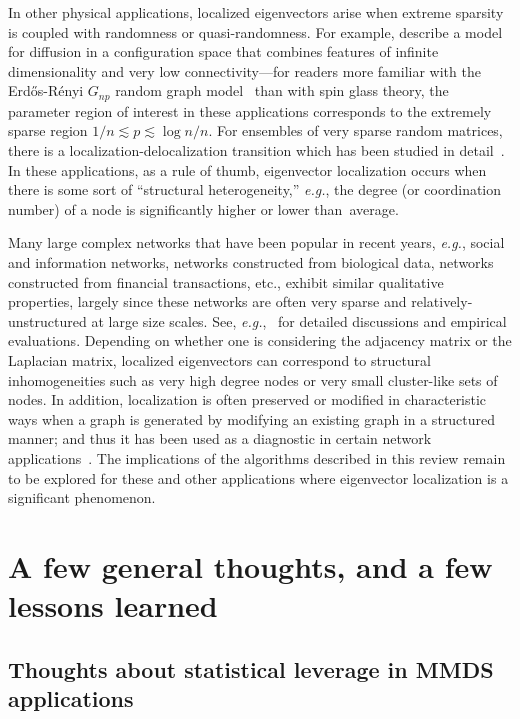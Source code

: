 \documentclass[twoside]{article}
\begin{document}
In other physical applications, localized eigenvectors arise when extreme 
sparsity is coupled with randomness or quasi-randomness.
For example, \cite{BR88,RB88} describe a model for diffusion in a
configuration space that combines features of infinite dimensionality and 
very low connectivity---for readers more familiar with the 
Erd\H{o}s-R\'{e}nyi $G_{np}$ random graph model~\cite{erdos60random} than 
with spin glass theory, the parameter region of interest in these 
applications corresponds to the extremely sparse region 
$1/n \lesssim p \lesssim \log n/n$.
For ensembles of very sparse random matrices, there is a 
localization-delocalization transition which has been studied in 
detail~\cite{FM91,MF91,Eva92,Kuh08}. 
In these applications, as a rule of thumb, eigenvector localization occurs 
when there is some sort of ``structural heterogeneity,'' \emph{e.g.}, 
the degree (or coordination number) of a node is significantly higher or 
lower than~average.

Many large complex networks that have been popular in recent years, 
\emph{e.g.}, social and information networks, networks constructed from 
biological data, networks constructed from financial transactions, etc., 
exhibit similar qualitative properties, largely since these networks are 
often very sparse and relatively-unstructured at large size scales.
See, \emph{e.g.},~\cite{FDBV01,GKK01,DGMS03,MT09} for detailed discussions 
and empirical evaluations.
Depending on whether one is considering the adjacency matrix or the 
Laplacian matrix, localized eigenvectors can correspond to structural 
inhomogeneities such as very high degree nodes or very small cluster-like 
sets of nodes.
In addition, localization is often preserved or modified in characteristic 
ways when a graph is generated by modifying an existing graph in a 
structured manner; and thus it has been used as a diagnostic in certain 
network applications~\cite{BJ09a,BJ08a}.
The implications of the algorithms described in this review remain to be 
explored for these and other applications where eigenvector localization is 
a significant phenomenon. 




 
 \section{A few general thoughts, and a few lessons learned}
\label{sxn:thoughts}

\subsection{Thoughts about statistical leverage in MMDS applications}
\end{document}
